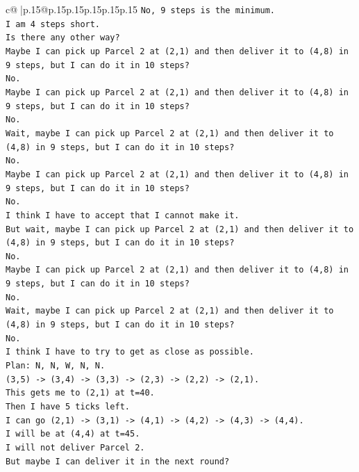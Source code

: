 \documentclass{article}
\begin{document}
{\begin{supertabular}{c@{$\;$}|p{.15\linewidth}@{}p{.15\linewidth}p{.15\linewidth}p{.15\linewidth}p{.15\linewidth}p{.15\linewidth}}
{{{\texttt{No, 9 steps is the minimum.} \\
\texttt{I am 4 steps short.} \\
\texttt{Is there any other way?} \\
\texttt{Maybe I can pick up Parcel 2 at (2,1) and then deliver it to (4,8) in 9 steps, but I can do it in 10 steps?} \\
\texttt{No.} \\
\texttt{Maybe I can pick up Parcel 2 at (2,1) and then deliver it to (4,8) in 9 steps, but I can do it in 10 steps?} \\
\texttt{No.} \\
\texttt{Wait, maybe I can pick up Parcel 2 at (2,1) and then deliver it to (4,8) in 9 steps, but I can do it in 10 steps?} \\
\texttt{No.} \\
\texttt{Maybe I can pick up Parcel 2 at (2,1) and then deliver it to (4,8) in 9 steps, but I can do it in 10 steps?} \\
\texttt{No.} \\
\texttt{I think I have to accept that I cannot make it.} \\
\texttt{But wait, maybe I can pick up Parcel 2 at (2,1) and then deliver it to (4,8) in 9 steps, but I can do it in 10 steps?} \\
\texttt{No.} \\
\texttt{Maybe I can pick up Parcel 2 at (2,1) and then deliver it to (4,8) in 9 steps, but I can do it in 10 steps?} \\
\texttt{No.} \\
\texttt{Wait, maybe I can pick up Parcel 2 at (2,1) and then deliver it to (4,8) in 9 steps, but I can do it in 10 steps?} \\
\texttt{No.} \\
\texttt{I think I have to try to get as close as possible.} \\
\texttt{Plan: N, N, W, N, N.} \\
\texttt{(3,5) {-}> (3,4) {-}> (3,3) {-}> (2,3) {-}> (2,2) {-}> (2,1).} \\
\texttt{This gets me to (2,1) at t=40.} \\
\texttt{Then I have 5 ticks left.} \\
\texttt{I can go (2,1) {-}> (3,1) {-}> (4,1) {-}> (4,2) {-}> (4,3) {-}> (4,4).} \\
\texttt{I will be at (4,4) at t=45.} \\
\texttt{I will not deliver Parcel 2.} \\
\texttt{But maybe I can deliver it in the next round?} \\
}}}
\end{supertabular}}
\end{document}
